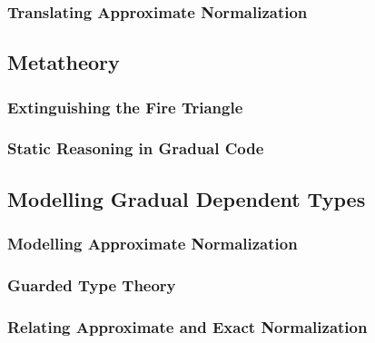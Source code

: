 \subsubsection{Translating Approximate Normalization}


\subsection{Metatheory}

\subsubsection{Extinguishing the Fire Triangle}

\subsubsection{Static Reasoning in Gradual Code}

\subsection{Modelling Gradual Dependent Types}


\subsubsection{Modelling Approximate Normalization}

\subsubsection{Guarded Type Theory}

\subsubsection{Relating Approximate and Exact Normalization}
